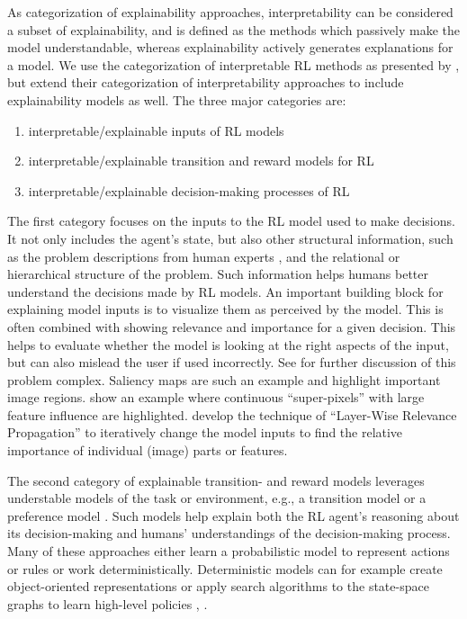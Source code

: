 \documentclass[twoside,11pt]{article}
\begin{document}
As categorization of explainability approaches, interpretability can be considered a subset of explainability, and is defined as the methods which passively make the model understandable, whereas explainability actively generates explanations for a model. We use the categorization of interpretable RL methods as presented by \citet{GlanoisEtAl:2021:SurveyInterpretableRL}, but extend their categorization of interpretability approaches to include explainability models as well. The three major categories are: 
\begin{enumerate}
    \item interpretable/explainable inputs of RL models
    \item interpretable/explainable transition and reward models for RL
    \item interpretable/explainable decision-making processes of RL
\end{enumerate}

The first category focuses on the inputs to the RL model used to make decisions. It not only includes the agent's state, but also other structural information, such as the problem descriptions from human experts \citep{hasanbeig2021deepsynth}, and the relational \citep{battaglia2018relational,martinez2017relational} or hierarchical structure \citep{andreas2017modular,lyu2019sdrl} of the problem. Such information helps humans better understand the decisions made by RL models. 
An important building block for explaining model inputs is to visualize them as perceived by the model. This is often combined with showing relevance and importance for a given decision. This helps to evaluate whether the model is looking at the right aspects of the input, but can also mislead the user if used incorrectly. See \citet{EvansEtAl:2021:ExplainabilityParadox} for further discussion of this problem complex.
Saliency maps are such an example and highlight important image regions. \citet{LiuEtAl:2018:LinearModelUTrees} show an example where continuous ``super-pixels'' with large feature influence are highlighted. \citet{Bach:2015:LayerWiseRelevancePropagation} develop the technique of ``Layer-Wise Relevance Propagation'' to iteratively change the model inputs to find the relative importance of individual (image) parts or features.

The second category of explainable transition- and reward models leverages understable models of the task or environment, e.g., a transition model \citep{martinez2016learning,zhu2020object} or a preference model \citep{icarte2018using,toro2019learning}. Such models help explain both the RL agent's reasoning about its decision-making and humans' understandings of the decision-making process. Many of these approaches either learn a probabilistic model to represent actions \citep{walsh2010efficient} or rules \citep{Walker} or work deterministically. Deterministic models can for example create object-oriented representations \citep{NEURIPS2018_df0aab05} or apply search algorithms to the state-space graphs to learn high-level policies \citep{pmlr-v80-zhang18k}, \citep{NEURIPS2019_5c48ff18}.
\end{document}
